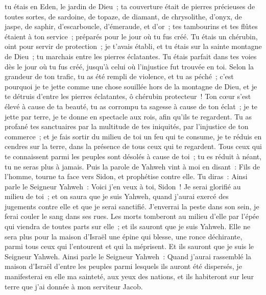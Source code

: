 \begin{multicols}{2}
tu étais en Eden, le jardin de Dieu~; ta couverture était de pierres précieuses de toutes sortes, de sardoine, de topaze, de diamant, de chrysolithe, d'onyx, de jaspe, de saphir, d'escarboucle, d'émeraude, et d'or~; tes tambourins et tes flûtes étaient à ton service~; préparés pour le jour où tu fus créé.
Tu étais un chérubin, oint pour servir de protection~; je t'avais établi, et tu étais sur la sainte montagne de Dieu~; tu marchais entre les pierres éclatantes.
Tu étais parfait dans tes voies dès le jour où tu fus créé, jusqu'à celui où l'injustice fut trouvée en toi.
Selon la grandeur de ton trafic, tu as été rempli de violence, et tu as péché~; c'est pourquoi je te jette comme une chose souillée hors de la montagne de Dieu, et je te détruis d'entre les pierres éclatantes, ô chérubin protecteur~!
Ton cœur s'est élevé à cause de ta beauté, tu as corrompu ta sagesse à cause de ton éclat~; je te jette par terre, je te donne en spectacle aux rois, afin qu'ils te regardent.
Tu as profané tes sanctuaires par la multitude de tes iniquités, par l'injustice de ton commerce~; et je fais sortir du milieu de toi un feu qui te consume, je te réduis en cendres sur la terre, dans la présence de tous ceux qui te regardent.
Tous ceux qui te connaissent parmi les peuples sont désolés à cause de toi~; tu es réduit à néant, tu ne seras plus à jamais.
Puis la parole de Yahweh vint à moi en disant~:
Fils de l'homme, tourne ta face vers Sidon, et prophétise contre elle.
Tu diras~: Ainsi parle le Seigneur Yahweh~: Voici j'en veux à toi, Sidon~! Je serai glorifié au milieu de toi~; et on saura que je suis Yahweh, quand j'aurai exercé des jugements contre elle et que je serai sanctifié.
J'enverrai la peste dans son sein, je ferai couler le sang dans ses rues. Les morts tomberont au milieu d'elle par l'épée qui viendra de toutes parts sur elle~; et ils sauront que je suis Yahweh.
Elle ne sera plus pour la maison d'Israël une épine qui blesse, une ronce déchirante, parmi tous ceux qui l'entourent et qui la méprisent. Et ils sauront que je suis le Seigneur Yahweh.
Ainsi parle le Seigneur Yahweh~: Quand j'aurai rassemblé la maison d'Israël d'entre les peuples parmi lesquels ils auront été dispersés, je manifesterai en elle ma sainteté, aux yeux des nations, et ils habiteront sur leur terre que j'ai donnée à mon serviteur Jacob.

\end{multicols}
